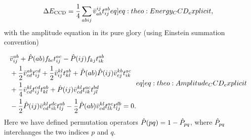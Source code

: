 \begin{align}
    \DECCD = \frac{1}{4} \sum_{abij} \elmASshort{ij}{ab} \amplitude{ab}{ij} \label[eq]{eq:theo:Energy_CCD_explicit},
\end{align}
with the amplitude equation in its pure glory (using Einstein summation convention)

\begin{align}
    \begin{split}
        &\elmASshort{ab}{ij} + \permoperator{ab} \fshort{b}{c} \amplitude{ac}{ij} - \permoperator{ij} \fshort{k}{j} \amplitude{ab}{ik} \\
        &+ \frac{1}{2} \elmASshort{ab}{cd} \amplitude{cd}{ij} + \frac{1}{2} \elmASshort{kl}{ij} \amplitude{ab}{kl} + \permoperator{ab} \permoperator{ij}\elmASshort{kb}{cj} \amplitude{ac}{ik} \\
        &+ \frac{1}{4}\elmASshort{kl}{cd} \amplitude{cd}{ij} \amplitude{ab}{kl} + \permoperator{ij} \elmASshort{kl}{cd} \amplitude{ac}{ik} \amplitude{bd}{jl} \\
        &- \frac{1}{2} \permoperator{ij} \elmASshort{kl}{cd} \amplitude{dc}{ik} \amplitude{ab}{lj} - \frac{1}{2} \permoperator{ab} \elmASshort{kl}{cd} \amplitude{ac}{lk} \amplitude{db}{lj} = 0.
    \end{split}\label[eq]{eq:theo:Amplitude_CCD_explicit}
\end{align}
Here we have defined permutation operators $\hat{P}(pq) = 1 - \hat{P}_{pq}$, where $\hat{P}_{pq}$ interchanges the two indices $p$ and $q$.